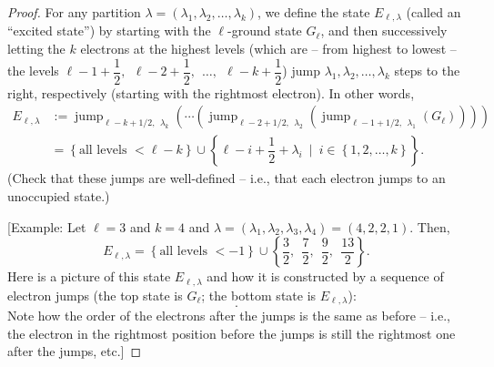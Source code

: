 \begin{proof}
For any partition $\lambda=\left(  \lambda_{1},\lambda_{2},\ldots,\lambda
_{k}\right)  $, we define the state $E_{\ell,\lambda}$ (called an
\textquotedblleft excited state\textquotedblright) by starting with the $\ell
$-ground state $G_{\ell}$, and then successively letting the $k$ electrons at
the highest levels (which are -- from highest to lowest -- the levels
$\ell-1+\dfrac{1}{2},\ \ \ell-2+\dfrac{1}{2},\ \ \ldots,\ \ \ell-k+\dfrac
{1}{2}$) jump $\lambda_{1},\lambda_{2},\ldots,\lambda_{k}$ steps to the right,
respectively (starting with the rightmost electron). In other words,%
\begin{align*}
E_{\ell,\lambda}  &  :=\operatorname*{jump}\nolimits_{\ell-k+1/2,\ \ \lambda
_{k}}\left(  \cdots\left(  \operatorname*{jump}\nolimits_{\ell
-2+1/2,\ \ \lambda_{2}}\left(  \operatorname*{jump}\nolimits_{\ell
-1+1/2,\ \ \lambda_{1}}\left(  G_{\ell}\right)  \right)  \right)  \right) \\
&  =\left\{  \text{all levels }<\ell-k\right\}  \cup\left\{  \ell-i+\dfrac
{1}{2}+\lambda_{i}\ \mid\ i\in\left\{  1,2,\ldots,k\right\}  \right\}  .
\end{align*}
(Check that these jumps are well-defined -- i.e., that each electron jumps to
an unoccupied state.)

[Example: Let $\ell=3$ and $k=4$ and $\lambda=\left(  \lambda_{1},\lambda
_{2},\lambda_{3},\lambda_{4}\right)  =\left(  4,2,2,1\right)  $. Then,%
\[
E_{\ell,\lambda}=\left\{  \text{all levels }<-1\right\}  \cup\left\{
\dfrac{3}{2},\ \ \dfrac{7}{2},\ \ \dfrac{9}{2},\ \ \dfrac{13}{2}\right\}  .
\]
Here is a picture of this state $E_{\ell,\lambda}$ and how it is constructed
by a sequence of electron jumps (the top state is $G_{\ell}$; the bottom state
is $E_{\ell,\lambda}$):%
\[%
.
\]
Note how the order of the electrons after the jumps is the same as before --
i.e., the electron in the rightmost position before the jumps is still the
rightmost one after the jumps, etc.]


\end{proof}
